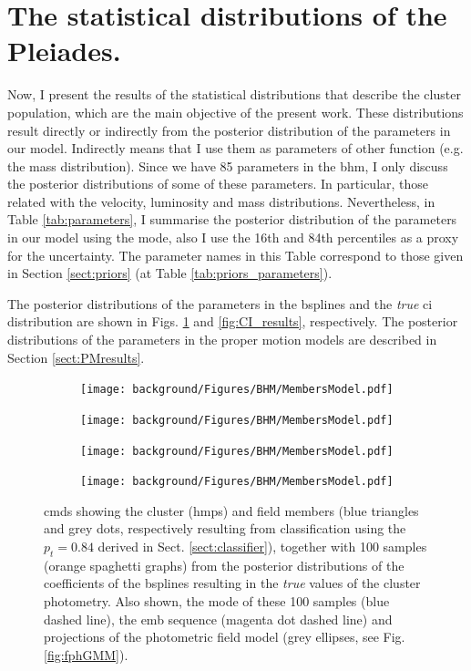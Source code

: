\section{The statistical distributions of the Pleiades.}
Now, I present the results of the statistical distributions that describe the cluster population, which are the main objective of the present work. These distributions result directly or indirectly from the posterior distribution of the parameters in our model. Indirectly means that I use them as parameters of other function (e.g. the mass distribution). Since we have 85 parameters in the \gls{bhm}, I only discuss the posterior distributions of some of these parameters. In particular, those related with the velocity, luminosity and mass distributions. Nevertheless, in Table \ref{tab:parameters}, I summarise the posterior distribution of the parameters in our model using the mode, also I use the 16th and 84th percentiles as a proxy for the uncertainty. The parameter names in this Table correspond to those given in Section \ref{sect:priors} (at Table \ref{tab:priors_parameters}). 

{The posterior distributions of the parameters in the \glspl{bspline} and the \emph{true} \gls{ci} distribution are shown in Figs. \ref{fig:CMDs_results} and \ref{fig:CI_results}, respectively.  The posterior distributions of the parameters in the proper motion models are described in Section \ref{sect:PMresults}.}

\begin{figure}[ht!]
    \centering
    \begin{subfigure}[t]{0.48\textwidth}
        \texttt{[image: background/Figures/BHM/MembersModel.pdf]}
        \caption{}
    \end{subfigure}
    \begin{subfigure}[t]{0.48\textwidth}
      \texttt{[image: background/Figures/BHM/MembersModel.pdf]}
        \caption{}
    \end{subfigure}
     \begin{subfigure}[t]{0.48\textwidth}
      \texttt{[image: background/Figures/BHM/MembersModel.pdf]}
        \caption{}   
    \end{subfigure}
     \begin{subfigure}[t]{0.48\textwidth}
      \texttt{[image: background/Figures/BHM/MembersModel.pdf]}
        \caption{}
    \end{subfigure}
\caption{\glspl{cmd} showing the cluster (\gls{hmps}) and field members (blue triangles and grey dots, respectively resulting from classification using the $p_t = 0.84$ derived in Sect. \ref{sect:classifier}), together with 100 samples (orange spaghetti graphs) from the posterior distributions of the coefficients of the \glspl{bspline} resulting in the \emph{true} values of the cluster photometry. Also shown, the mode of these 100 samples (blue dashed line), the \gls{emb} sequence (magenta dot dashed line) and projections of the photometric field model (grey ellipses, see Fig. \ref{fig:fphGMM}).}
\label{fig:CMDs_results}
\end{figure}

